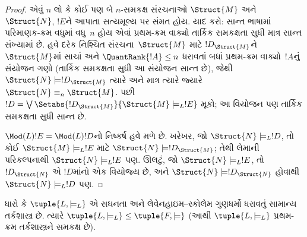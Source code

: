 \begin{proof}
એવું $n$ લો કે કોઈ પણ બે $n$-સમકક્ષ સંરચનાઓ $\Struct{M}$ અને
$\Struct{N}$, $!E$ને આપાતા સત્યમૂલ્ય પર સંમત હોય.
 યાદ કરો: સાન્ત ભાષામાં
પરિમાણક-ક્રમ વધુમાં વધુ~$n$ હોય એવાં પ્રથમ-ક્રમ વાક્યો તાર્કિક
સમકક્ષતા સુધી માત્ર સાન્ત સંખ્યામાં છે. હવે દરેક નિશ્ચિત
સંરચના~$\Struct{M}$ માટે $!D_{\Struct{M}}$ને $\Struct{M}$માં
સાચાં અને $\QuantRank{!A} \le n$ ધરાવતાં બધાં પ્રથમ-ક્રમ
વાક્યો~$!A$નું સંયોજન ગણો (તાર્કિક સમકક્ષતા સુધી આ સંયોજન
સાન્ત છે), જેથી $\Struct{N} \models !D_{\Struct{M}}$ ત્યારે અને માત્ર
ત્યારે જ્યારે $\Struct{N} \equiv_n \Struct{M}$. પછી
$!D = \textstyle\bigvee
\Setabs{!D_{\Struct{M}}}{\Struct{M} \models_L !E}$ મૂકો; આ વિયોજન પણ
તાર્કિક સમકક્ષતા સુધી સાન્ત છે.

$\Mod(L){!E} = \Mod(L){!D}$નો નિષ્કર્ષ હવે મળે છે. ખરેખર, જો
$\Struct{N} \models_L !D$, તો કોઈ $\Struct{M} \models_L !E$ માટે
$\Struct{N} \models !D_{\Struct{M}}$; તેથી લેમાની પરિકલ્પનાથી
$\Struct{N} \models_L !E$ પણ. ઊલટું, જો $\Struct{N} \models_L !E$,
તો $!D_\Struct{N}$ એ $!D$માંનો એક વિયોજ્ય છે, અને $\Struct{N}
\models !D_\Struct{N}$ હોવાથી $\Struct{N} \models_L !D$ પણ.
\end{proof}

\begin{thm}[લિન્ડસ્ટ્રોમનું પ્રમેય]
   ધારો કે $\tuple{L, \models_L}$ એ સઘનતા અને
  લેવેનહાઇમ--સ્કોલેમ ગુણધર્મો ધરાવતું સામાન્ય તર્કશાસ્ત્ર છે. ત્યારે
  $\tuple{L, \models_L} \le \tuple{F, \models}$ (આથી
  $\tuple{L, \models_L}$ પ્રથમ-ક્રમ તર્કશાસ્ત્રને સમકક્ષ છે).
\end{thm}

